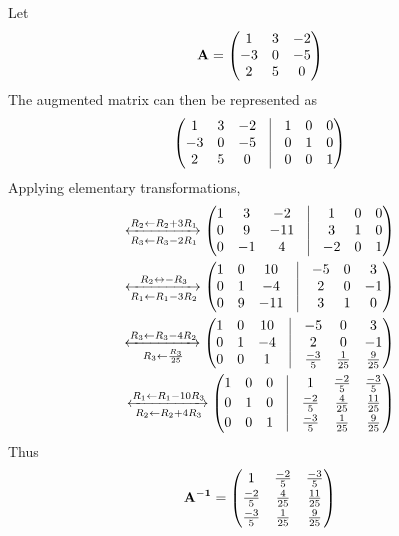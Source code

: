 Let 
\begin{align}
 \mathbf{A}=\begin{pmatrix} 1 & 3 & -2\\-3 & 0 & -5\\2 & 5 & 0\\\end{pmatrix}
\end{align}
The augmented matrix can then be represented as 
    \begin{align}
		\myvec{1 & 3 & -2 & \vrule & 1 & 0 & 0\\
		       -3 & 0 & -5 & \vrule & 0 & 1 & 0\\
		       2 & 5 & 0 &\vrule & 0 & 0 & 1}
	\end{align}
Applying elementary transformations, 
\begin{align}
		\xleftrightarrow[R_3 \leftarrow R_3-2R_1]{R_2 \leftarrow R_2+3R_1}
		\myvec{1 & 3 & -2 & \vrule & 1 & 0 & 0\\
		       0 & 9 & -11 & \vrule & 3 & 1 & 0\\
		       0 & -1 & 4 &\vrule & -2 & 0 & 1}\\
		\xleftrightarrow[R_1 \leftarrow R_1-3R_2]{R_2 \leftrightarrow -R_3}
		\myvec{1 & 0 & 10 & \vrule & -5 & 0 & 3\\
		       0 & 1 & -4 & \vrule & 2 & 0 & -1\\
		       0 & 9 & -11 &\vrule & 3 & 1 & 0}\\
		\xleftrightarrow[R_3 \leftarrow \frac{R_3}{25}]{R_3 \leftarrow R_3-4R_2}
		\myvec{1 & 0 & 10 & \vrule & -5 & 0 & 3\\
		       0 & 1 & -4 & \vrule & 2 & 0 & -1\\
		       0 & 0 & 1 &\vrule & \frac{-3}{5} & \frac{1}{25} & \frac{9}{25}}\\
		\xleftrightarrow[R_2 \leftarrow R_2+4R_3]{R_1 \leftarrow R_1-10R_3}
		\myvec{1 & 0 & 0 & \vrule & 1 & \frac{-2}{5} & \frac{-3}{5}\\[2pt]
		       0 & 1 & 0 & \vrule & \frac{-2}{5} & \frac{4}{25} & \frac{11}{25}\\[2pt]
		       0 & 0 & 1 &\vrule & \frac{-3}{5} & \frac{1}{25} & \frac{9}{25}}
\end{align}
Thus 
\begin{align}
	\mathbf {A^{-1}} = 	\begin{pmatrix} 1 & \frac{-2}{5} & \frac{-3}{5}\\[2pt]
		       \frac{-2}{5} & \frac{4}{25} & \frac{11}{25}\\[2pt]
		       \frac{-3}{5} & \frac{1}{25} & \frac{9}{25}\end{pmatrix}
\end{align}

